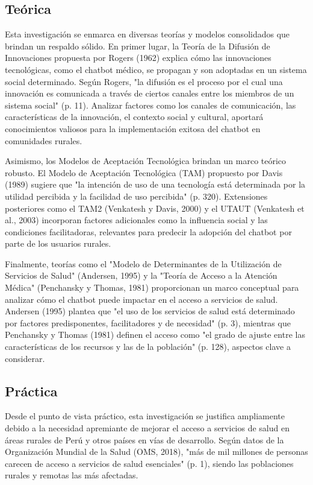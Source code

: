 \subsection{Teórica}
Esta investigación se enmarca en diversas teorías y modelos consolidados que brindan un respaldo sólido. En primer lugar, la Teoría de la Difusión de Innovaciones propuesta por Rogers (1962) explica cómo las innovaciones tecnológicas, como el chatbot médico, se propagan y son adoptadas en un sistema social determinado. Según Rogers, "la difusión es el proceso por el cual una innovación es comunicada a través de ciertos canales entre los miembros de un sistema social" (p. 11). Analizar factores como los canales de comunicación, las características de la innovación, el contexto social y cultural, aportará conocimientos valiosos para la implementación exitosa del chatbot en comunidades rurales.

Asimismo, los Modelos de Aceptación Tecnológica brindan un marco teórico robusto. El Modelo de Aceptación Tecnológica (TAM) propuesto por Davis (1989) sugiere que "la intención de uso de una tecnología está determinada por la utilidad percibida y la facilidad de uso percibida" (p. 320). Extensiones posteriores como el TAM2 (Venkatesh y Davis, 2000) y el UTAUT (Venkatesh et al., 2003) incorporan factores adicionales como la influencia social y las condiciones facilitadoras, relevantes para predecir la adopción del chatbot por parte de los usuarios rurales.

Finalmente, teorías como el "Modelo de Determinantes de la Utilización de Servicios de Salud" (Andersen, 1995) y la "Teoría de Acceso a la Atención Médica" (Penchansky y Thomas, 1981) proporcionan un marco conceptual para analizar cómo el chatbot puede impactar en el acceso a servicios de salud. Andersen (1995) plantea que "el uso de los servicios de salud está determinado por factores predisponentes, facilitadores y de necesidad" (p. 3), mientras que Penchansky y Thomas (1981) definen el acceso como "el grado de ajuste entre las características de los recursos y las de la población" (p. 128), aspectos clave a considerar.

\subsection{Práctica}
Desde el punto de vista práctico, esta investigación se justifica ampliamente debido a la necesidad apremiante de mejorar el acceso a servicios de salud en áreas rurales de Perú y otros países en vías de desarrollo. Según datos de la Organización Mundial de la Salud (OMS, 2018), "más de mil millones de personas carecen de acceso a servicios de salud esenciales" (p. 1), siendo las poblaciones rurales y remotas las más afectadas.

